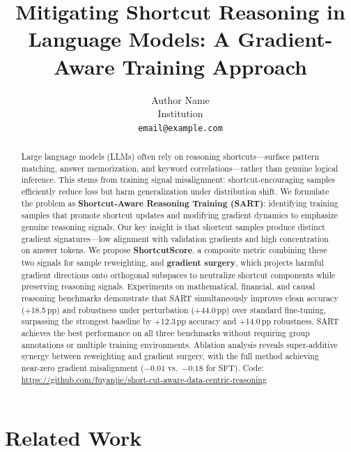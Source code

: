 \documentclass{article}
\title{Mitigating Shortcut Reasoning in Language Models: A Gradient-Aware Training Approach}
\author{Author Name \\ Institution \\ \texttt{email@example.com}}
\date{}
\begin{document}
\maketitle

\begin{abstract}
Large language models (LLMs) often rely on reasoning shortcuts---surface pattern matching, answer memorization, and keyword correlations---rather than genuine logical inference. This stems from training signal misalignment: shortcut-encouraging samples efficiently reduce loss but harm generalization under distribution shift. We formulate the problem as \textbf{Shortcut-Aware Reasoning Training (SART)}: identifying training samples that promote shortcut updates and modifying gradient dynamics to emphasize genuine reasoning signals. Our key insight is that shortcut samples produce distinct gradient signatures---low alignment with validation gradients and high concentration on answer tokens. We propose \textbf{ShortcutScore}, a composite metric combining these two signals for sample reweighting, and \textbf{gradient surgery}, which projects harmful gradient directions onto orthogonal subspaces to neutralize shortcut components while preserving reasoning signals. Experiments on mathematical, financial, and causal reasoning benchmarks demonstrate that SART simultaneously improves clean accuracy (+18.5\,pp) and robustness under perturbation (+44.0\,pp) over standard fine-tuning, surpassing the strongest baseline by +12.3\,pp accuracy and +14.0\,pp robustness. SART achieves the best performance on all three benchmarks without requiring group annotations or multiple training environments. Ablation analysis reveals super-additive synergy between reweighting and gradient surgery, with the full method achieving near-zero gradient misalignment ($-0.01$ vs.\ $-0.18$ for SFT). Code: \url{https://github.com/fuyanjie/short-cut-aware-data-centric-reasoning}
\end{abstract}







\section{Related Work}
\end{document}
